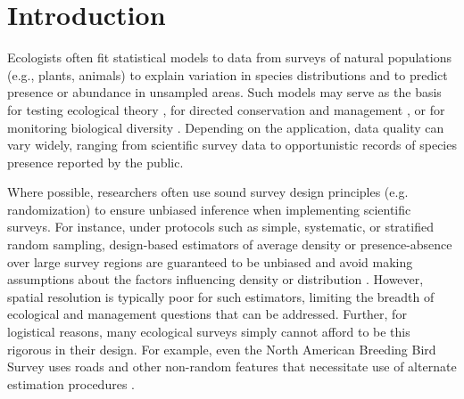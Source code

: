 \documentclass[times,mee,doublespace,]{besauth2}
\begin{document}

\maketitle \linenumbers

\def\VAR{{\rm Var}\,}
\def\COV{{\rm Cov}\,}
\def\Prob{{\rm P}\,}
\def\bfX{\bf X}
\def\bfbeta{\boldsymbol{\beta}}
\def\bfdelta{\boldsymbol{\delta}}
\def\bfeta{\boldsymbol{\eta}}
\def\bfnu{\boldsymbol{\nu}}
\def\bfmu{\boldsymbol{\mu}}


\section{Introduction}


Ecologists often fit statistical models to data from surveys of natural populations (e.g., plants, animals) to explain variation in species distributions and to predict presence or abundance in unsampled areas. Such models may serve as the basis for testing ecological theory \citep{HilbornMangel1997,Austin2007}, for directed conservation and management \citep{WilliamsEtAl2002,NicholsWilliams2006}, or for monitoring biological diversity \citep{PereiraCooper2006,YoccozEtAl2001}.  Depending on the application, data quality can vary widely, ranging from scientific survey data to opportunistic records of species presence reported by the public.

Where possible, researchers often use sound survey design principles (e.g. randomization) to ensure unbiased inference when implementing scientific surveys.  For instance, under protocols such as simple, systematic, or stratified random sampling, design-based estimators of average density or presence-absence over large survey regions are guaranteed to be unbiased and avoid making assumptions about the factors influencing density or distribution \citep{Cochran1977,BucklandEtAl2000}.  However, spatial resolution is typically poor for such estimators, limiting the breadth of ecological and management questions that can be addressed. Further, for logistical reasons, many ecological surveys simply cannot afford to be this rigorous in their design.  For example, even the North American Breeding Bird Survey uses roads and other non-random features that necessitate use of alternate estimation procedures \citep{SauerLink2011}.
\end{document}
